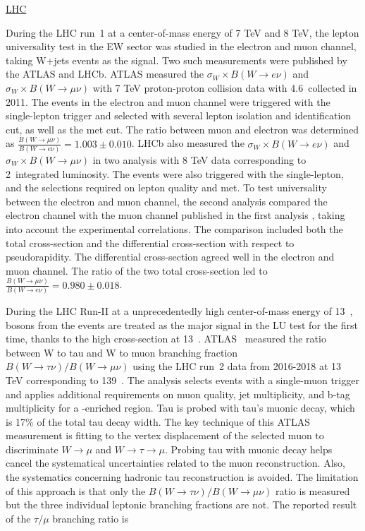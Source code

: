 


\underline{LHC}

During the LHC run~1 at a center-of-mass energy of 7 TeV and 8 TeV, the lepton universality test in the EW sector was studied in the electron and muon channel, taking W+jets events as the signal. Two such measurements were published by the ATLAS and LHCb. ATLAS measured the $\sigma_W \times B(W \to e \nu)$ and $\sigma_W \times B(W \to \mu \nu)$ \cite{Aaboud:2016btc} with 7 TeV proton-proton collision data with 4.6~\fbinv collected in 2011. The events in the electron and muon channel were triggered with the single-lepton trigger and selected with several lepton isolation and identification cut, as well as the met cut. The ratio between muon and electron was determined as $\frac{ B(W  \to \mu \nu) }{ B(W \to e \nu)} = 1.003\pm 0.010$. LHCb also measured the $\sigma_W \times B(W \to e \nu)$ \cite{Aaij:2016qqz} and $\sigma_W \times B(W \to \mu \nu)$ \cite{Aaij:2015zlq} in two analysis with 8 TeV data corresponding to 2~\fbinv integrated luminosity. The events were also triggered with the single-lepton, and the selections required on lepton quality and met. To test universality between the electron and muon channel, the second analysis \cite{Aaij:2016qqz} compared the electron channel with the muon channel published in the first analysis \cite{Aaij:2015zlq}, taking into account the experimental correlations. The comparison included both the total cross-section and the differential cross-section with respect to pseudorapidity. The differential cross-section agreed well in the electron and muon channel. The ratio of the two total cross-section led to $\frac{ B(W  \to \mu \nu) }{ B(W \to e \nu)}  = 0.980 \pm 0.018 $.


During the LHC Run-II at a unprecedentedly high center-of-mass energy of 13~\TeV, \PW bosons from the \ttbar events are treated as the major signal in the LU test for the first time, thanks to the high \ttbar cross-section at 13~\TeV. ATLAS~\cite{Aad:2020ayz} measured the ratio between W to tau and W to muon branching fraction $B(W  \to \tau \nu) / B(W \to \mu \nu) $ using the LHC run~2 data from 2016-2018 at 13 TeV corresponding to 139~\fbinv. The analysis selects \ttbar events with a single-muon trigger and applies additional requirements on muon quality, jet multiplicity, and b-tag multiplicity for a \ttbar-enriched region. Tau is probed with tau's muonic decay, which is 17\% of the total tau decay width. The key technique of this ATLAS measurement is fitting to the vertex displacement of the selected muon to discriminate $W \to \mu$ and $W \to \tau \to \mu$. Probing tau with muonic decay helps cancel the systematical uncertainties related to the muon reconstruction. Also, the systematics concerning hadronic tau reconstruction is avoided. The limitation of this approach is that only the $B(W  \to \tau \nu) / B(W \to \mu \nu) $ ratio is measured but the three individual leptonic branching fractions are not. The reported result of the $\tau / \mu $ branching ratio is

